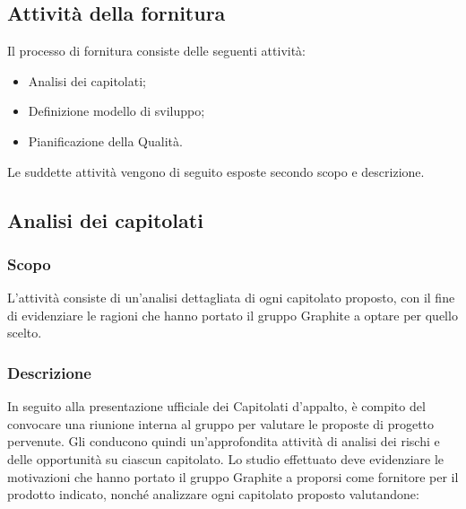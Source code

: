 \documentclass[../NormediProgetto.tex]{subfiles}
\begin{document}

\subsection{Attività della fornitura}

Il processo di fornitura consiste delle seguenti attività:

\begin{itemize}
	\item Analisi dei capitolati;
	
	\item Definizione modello di sviluppo; 
	
	\item Pianificazione della Qualità.
\end{itemize}

\noindent Le suddette attività vengono di seguito esposte secondo scopo e descrizione.


\subsection{Analisi dei capitolati}
\subsubsection{Scopo}

L'attività consiste di un'analisi dettagliata di ogni capitolato proposto, con il fine di evidenziare le ragioni che hanno portato il gruppo Graphite a optare per quello scelto.

\subsubsection{Descrizione} 
In seguito alla presentazione ufficiale dei Capitolati d'appalto, è compito del  convocare una riunione interna al gruppo per valutare le proposte di progetto pervenute. Gli  conducono quindi un'approfondita attività di analisi dei rischi e delle opportunità su ciascun capitolato.
Lo studio effettuato deve evidenziare le motivazioni che hanno portato il gruppo Graphite a proporsi come fornitore per il prodotto indicato, nonché analizzare ogni capitolato proposto valutandone:
 
\end{document}
